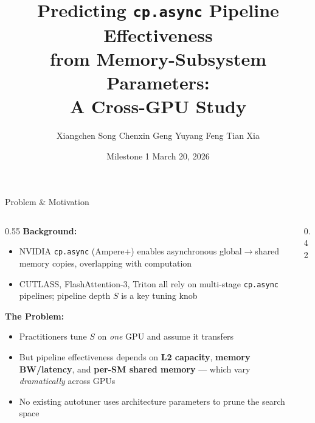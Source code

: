 \documentclass[aspectratio=169,10pt]{beamer}
\title[cp.async Cross-GPU Study]{Predicting \texttt{cp.async} Pipeline Effectiveness\\from Memory-Subsystem Parameters:\\A Cross-GPU Study}
\author{Xiangchen Song \quad Chenxin Geng \quad Yuyang Feng \quad Tian Xia}
\institute{EECS 570 -- Parallel Computer Architecture \\ University of Michigan}
\date{Milestone 1 \quad March 20, 2026}
\begin{document}
\begin{frame}
\titlepage
\end{frame}

\begin{frame}{Problem \& Motivation}

\begin{columns}[T]
\begin{column}{0.55\textwidth}
\textbf{Background:}
\begin{itemize}
    \item NVIDIA \texttt{cp.async} (Ampere+) enables asynchronous global$\to$shared memory copies, overlapping with computation
    \item CUTLASS, FlashAttention-3, Triton all rely on multi-stage \texttt{cp.async} pipelines; pipeline depth $S$ is a key tuning knob
\end{itemize}

\vspace{0.5em}
\textbf{The Problem:}
\begin{itemize}
    \item Practitioners tune $S$ on \emph{one} GPU and assume it transfers
    \item But pipeline effectiveness depends on \textbf{L2 capacity}, \textbf{memory BW/latency}, and \textbf{per-SM shared memory} --- which vary \emph{dramatically} across GPUs
    \item No existing autotuner uses architecture parameters to prune the search space
\end{itemize}
\end{column}

\begin{column}{0.42\textwidth}
\end{column}
\end{columns}
\end{frame}
\end{document}
